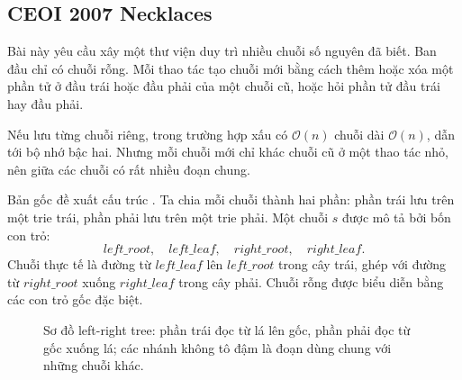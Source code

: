 \documentclass[11pt]{article}
\newcommand{\Oh}{\mathcal{O}}
\begin{document}
\subsection{CEOI 2007 Necklaces}

Bài này yêu cầu xây một thư viện duy trì nhiều chuỗi số nguyên đã biết. Ban
đầu chỉ có chuỗi rỗng. Mỗi thao tác tạo chuỗi mới bằng cách thêm hoặc xóa một
phần tử ở đầu trái hoặc đầu phải của một chuỗi cũ, hoặc hỏi phần tử đầu trái
hay đầu phải.

Nếu lưu từng chuỗi riêng, trong trường hợp xấu có \(\Oh(n)\) chuỗi dài
\(\Oh(n)\), dẫn tới bộ nhớ bậc hai. Nhưng mỗi chuỗi mới chỉ khác chuỗi cũ ở
một thao tác nhỏ, nên giữa các chuỗi có rất nhiều đoạn chung.

Bản gốc đề xuất cấu trúc . Ta chia mỗi chuỗi thành hai
phần: phần trái lưu trên một trie trái, phần phải lưu trên một trie phải. Một
chuỗi \(s\) được mô tả bởi bốn con trỏ:
\[
  left\_root,\quad left\_leaf,\quad right\_root,\quad right\_leaf.
\]
Chuỗi thực tế là đường từ \(left\_leaf\) lên \(left\_root\) trong cây trái,
ghép với đường từ \(right\_root\) xuống \(right\_leaf\) trong cây phải. Chuỗi
rỗng được biểu diễn bằng các con trỏ gốc đặc biệt.

\begin{figure}[htbp]
\centering
{}
\caption{Sơ đồ left-right tree: phần trái đọc từ lá lên gốc, phần phải đọc từ gốc xuống lá; các nhánh không tô đậm là đoạn dùng chung với những chuỗi khác.}
\end{figure}
\end{document}
